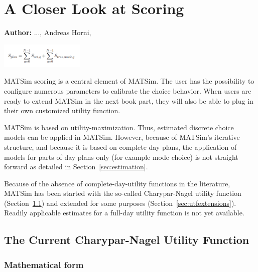 \chapter{A Closer Look at Scoring}
\label{ch:scoring}

\hfill \textbf{Author:} ..., Andreas Horni, 

\begin{center} \includegraphics[width=0.3\textwidth, angle=0]{using/figures/utf.png} \end{center}

MATSim scoring is a central element of MATSim. The user has the possibility to configure numerous parameters to calibrate the choice behavior. When users are ready to extend MATSim in the next book part, they will also be able to plug in their own customized utility function.

MATSim is based on utility-maximization. Thus, estimated discrete choice models can be applied in MATSim. However, because of MATSim's iterative structure, and because it is based on complete day plans, the application of models for parts of day plans only (for example mode choice) is not straight forward as detailed in Section~\ref{sec:estimation}.


Because of the absence of complete-day-utility functions in the literature, MATSim has been started with the so-called Charypar-Nagel utility function (Section~\ref{sec:charyparnagel}) and extended for some purposes (Section~\ref{sec:utfextensions}). Readily applicable estimates for a full-day utility function is not yet available. 

\section{The Current Charypar-Nagel Utility Function}
\label{sec:charyparnagel}

\subsection{Mathematical form}

